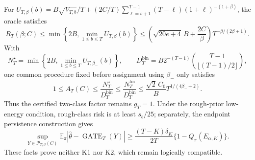 For \(U_{T,\beta}(b)=B\sqrt{V_{T,b}}/T+(2C/T)\sum_{\ell=b+1}^{T-1}(T-\ell)(1+\ell)^{-(1+\beta)}\), the oracle satisfies
\[
R_T(\beta;C)\le\min\left\{2B,\min_{1\le b\le T}U_{T,\beta}(b)\right\}
\le\left(\sqrt{20e+4}\,B+\frac{2C}{\beta}\right)T^{-\beta/(2\beta+1)}.
\]
With
\[
N_T^\star=\min\left\{2B,\min_{1\le b\le T}U_{T,\beta_-}(b)\right\},
\qquad
D_T^{\mathrm{bin}}=B2^{-(T-1)}\binom{T-1}{\lfloor(T-1)/2\rfloor},
\]
one common procedure fixed before assignment using \(\beta_-\) only satisfies
\[
1\le A_T(C)\le\frac{N_T^\star}{D_T^{\mathrm{bin}}}
\le\frac{N_T^{\mathrm{fin}}}{D_T^{\mathrm{bin}}}
\le\frac{\sqrt2\,C_0}{B}T^{1/(4\beta_-+2)}.
\]
Thus the certified two-class factor remains \(g_T=1\). Under the rough-prior low-energy condition, rough-class risk is at least \(s_b/25\); separately, the endpoint persistence construction gives
\[
\sup_{Y\in\mathcal P_{T,\beta}(C)}\mathbb E_\pi|\widehat\theta-\operatorname{GATE}_T(Y)|
\ge\frac{(T-K)\delta_K}{2T}\{1-Q_\pi(E_{\alpha,K})\}.
\]
These facts prove neither K1 nor K2, which remain logically compatible.